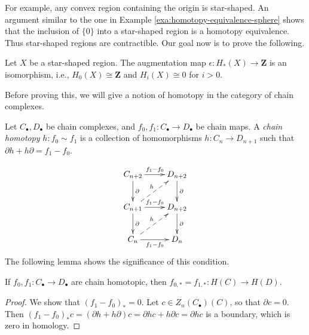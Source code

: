 For example, any convex region containing the origin is star-shaped. An argument similar to the one in Example \ref{exa:homotopy-equivalence-sphere} shows that the inclusion of $\{0\}$ into a star-shaped region is a homotopy equivalence. Thus star-shaped regions are contractible. Our goal now is to prove the following.
\begin{theorem}\label{thm:star-shaped-homology}
	Let $X$ be a star-shaped region. The augmentation map $\epsilon: H_\ast(X)\to \mathbf{Z}$ is an isomorphism, i.e., $ H_0(X)\cong\mathbf{Z}$ and $ H_i(X)\cong 0$ for $i>0$.
\end{theorem}
Before proving this, we will give a notion of homotopy in the category of chain complexes.
\begin{definition}
Let $C_\bullet,D_\bullet$ be chain complexes, and $f_0,f_1:C_\bullet\to D_\bullet$ be chain maps. A \emph{chain homotopy} $h:f_0\sim f_1$ is a collection of homomorphisms $h:C_n\to D_{n+1}$ such that $\partial h+h\partial=f_1-f_0$.
\end{definition}
			\begin{equation*}
			\xymatrix{C_{n+2}\ar[r]^{f_1-f_0}\ar[d]^\partial & D_{n+2}\ar[d]^\partial\\
			C_{n+1}\ar@{-->}[ur]^h\ar[r]^{f_1-f_0}\ar[d]^\partial & D_{n+2}\ar[d]^\partial\\
			C_n\ar@{-->}[ur]^h\ar[r]_{f_1-f_0} & D_n}
			\end{equation*}
The following lemma shows the significance of this condition.
\begin{lemma}
	If $f_0,f_1:C_\bullet\to D_\bullet$ are chain homotopic, then $f_{0,\ast}=f_{1,\ast}: H(C)\to H(D)$.
\end{lemma}
\begin{proof}
	We show that $(f_1-f_0)_\ast=0$. Let $c\in Z_n(C_\bullet)(C)$, so that $\partial c=0$. Then $(f_1-f_0)_\ast c=(\partial h+h\partial)c=\partial hc+h\partial c=\partial hc$ is a boundary, which is zero in homology.
\end{proof}
